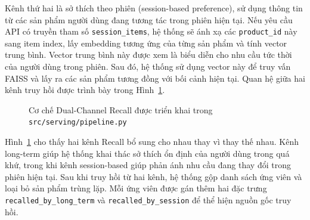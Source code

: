 Kênh thứ hai là sở thích theo phiên (session-based preference), sử dụng thông tin từ các sản phẩm người dùng đang tương tác trong phiên hiện tại. Nếu yêu cầu API có truyền tham số \texttt{session\_items}, hệ thống sẽ ánh xạ các \texttt{product\_id} này sang item index, lấy embedding tương ứng của từng sản phẩm và tính vector trung bình. Vector trung bình này được xem là biểu diễn cho nhu cầu tức thời của người dùng trong phiên. Sau đó, hệ thống sử dụng vector này để truy vấn FAISS và lấy ra các sản phẩm tương đồng với bối cảnh hiện tại. Quan hệ giữa hai kênh truy hồi được trình bày trong Hình~\ref{fig:dual_channel_recall}.

\begin{figure}[H]
\centering
{}
\caption[Cơ chế Dual-Channel Recall]{Cơ chế Dual-Channel Recall được triển khai trong \texttt{src/serving/pipeline.py}}
\label{fig:dual_channel_recall}
\end{figure}

Hình~\ref{fig:dual_channel_recall} cho thấy hai kênh Recall bổ sung cho nhau thay vì thay thế nhau. Kênh long-term giúp hệ thống khai thác sở thích ổn định của người dùng trong quá khứ, trong khi kênh session-based giúp phản ánh nhu cầu đang thay đổi trong phiên hiện tại. Sau khi truy hồi từ hai kênh, hệ thống gộp danh sách ứng viên và loại bỏ sản phẩm trùng lặp. Mỗi ứng viên được gán thêm hai đặc trưng \texttt{recalled\_by\_long\_term} và \texttt{recalled\_by\_session} để thể hiện nguồn gốc truy hồi.

